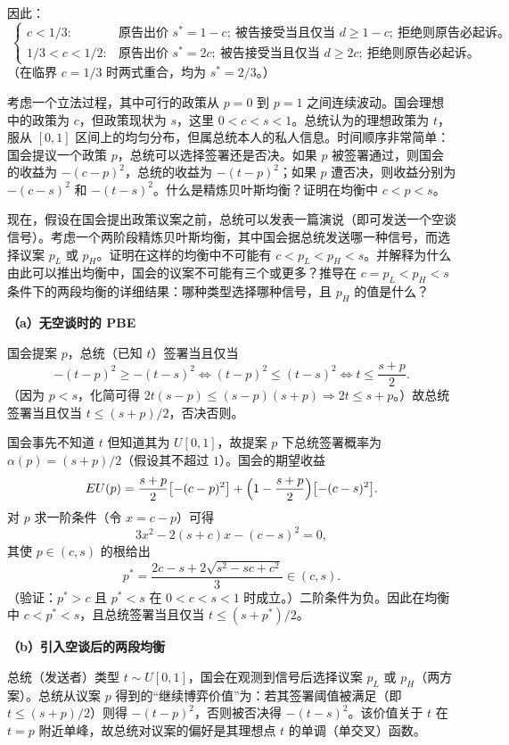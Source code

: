 因此：
\[
  \boxed{\;
  \begin{cases}
  c<1/3:&\text{原告出价 }s^*=1-c;\ \text{被告接受当且仅当 }d\ge 1-c;\ \text{拒绝则原告必起诉。}\\[2pt]
  1/3<c<1/2:&\text{原告出价 }s^*=2c;\ \text{被告接受当且仅当 }d\ge 2c;\ \text{拒绝则原告必起诉。}
  \end{cases}
  \;}
\]\indent
（在临界 $c=1/3$ 时两式重合，均为 $s^*=2/3$。）

考虑一个立法过程，其中可行的政策从 $p=0$ 到 $p=1$ 之间连续波动。国会理想中的政策为 $c$，但政策现状为 $s$，这里 $0<c<s<1$。总统认为的理想政策为 $t$，服从 $[0,1]$ 区间上的均匀分布，但属总统本人的私人信息。时间顺序非常简单：国会提议一个政策 $p$，总统可以选择签署还是否决。如果 $p$ 被签署通过，则国会的收益为 $-(c-p)^2$，总统的收益为 $-(t-p)^2$；如果 $p$ 遭否决，则收益分别为 $-(c-s)^2$ 和 $-(t-s)^2$。什么是精炼贝叶斯均衡？证明在均衡中 $c<p<s$。

现在，假设在国会提出政策议案之前，总统可以发表一篇演说（即可发送一个空谈信号）。考虑一个两阶段精炼贝叶斯均衡，其中国会据总统发送哪一种信号，而选择议案 $p_L$ 或 $p_H$。证明在这样的均衡中不可能有 $c<p_L<p_H<s$。并解释为什么由此可以推出均衡中，国会的议案不可能有三个或更多？推导在 $c=p_L<p_H<s$ 条件下的两段均衡的详细结果：哪种类型选择哪种信号，且 $p_H$ 的值是什么？

\sol \textbf{（a）无空谈时的 PBE}

国会提案 $p$，总统（已知 $t$）签署当且仅当
\[
  -(t-p)^2\ge -(t-s)^2\iff (t-p)^2\le (t-s)^2\iff t\le \frac{s+p}{2}.
\]\indent
（因为 $p<s$，化简可得 $2t(s-p)\le (s-p)(s+p)\Rightarrow 2t\le s+p$。）故总统签署当且仅当 $t\le (s+p)/2$，否决否则。

国会事先不知道 $t$ 但知道其为 $U[0,1]$，故提案 $p$ 下总统签署概率为 $\alpha(p)=(s+p)/2$（假设其不超过 $1$）。国会的期望收益
\[
  EU(p)=\frac{s+p}{2}\bigl[-(c-p)^2\bigr]+\Bigl(1-\frac{s+p}{2}\Bigr)\bigl[-(c-s)^2\bigr].
\]\indent
对 $p$ 求一阶条件（令 $x=c-p$）可得
\[
  3x^2-2(s+c)x-(c-s)^2=0,
\]\indent
其使 $p\in(c,s)$ 的根给出
\[
  p^*=\frac{2c-s+2\sqrt{s^2-sc+c^2}}{3}\in(c,s).
\]\indent
（验证：$p^*>c$ 且 $p^*<s$ 在 $0<c<s<1$ 时成立。）二阶条件为负。因此在均衡中 $c<p^*<s$，且总统签署当且仅当 $t\le (s+p^*)/2$。

\noindent\textbf{（b）引入空谈后的两段均衡}

总统（发送者）类型 $t\sim U[0,1]$，国会在观测到信号后选择议案 $p_L$ 或 $p_H$（两方案）。总统从议案 $p$ 得到的“继续博弈价值”为：若其签署阈值被满足（即 $t\le(s+p)/2$）则得 $-(t-p)^2$，否则被否决得 $-(t-s)^2$。该价值关于 $t$ 在 $t=p$ 附近单峰，故总统对议案的偏好是其理想点 $t$ 的单调（单交叉）函数。

